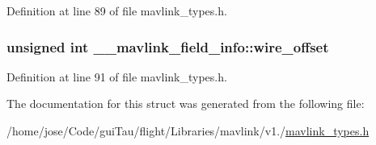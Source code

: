 Definition at line 89 of file mavlink\-\_\-types.\-h.

\hypertarget{struct____mavlink__field__info_a7156648575e497f112fde78e851dd4d9}{
\subsubsection[{wire\-\_\-offset}]{\setlength{\rightskip}{0pt plus 5cm}unsigned int \-\_\-\-\_\-mavlink\-\_\-field\-\_\-info\-::wire\-\_\-offset}}\label{struct____mavlink__field__info_a7156648575e497f112fde78e851dd4d9}


Definition at line 91 of file mavlink\-\_\-types.\-h.



The documentation for this struct was generated from the following file\-:\begin{DoxyCompactItemize}
\item 
/home/jose/\-Code/gui\-Tau/flight/\-Libraries/mavlink/v1./\hyperlink{mavlink__types_8h}{mavlink\-\_\-types.\-h}\end{DoxyCompactItemize}
